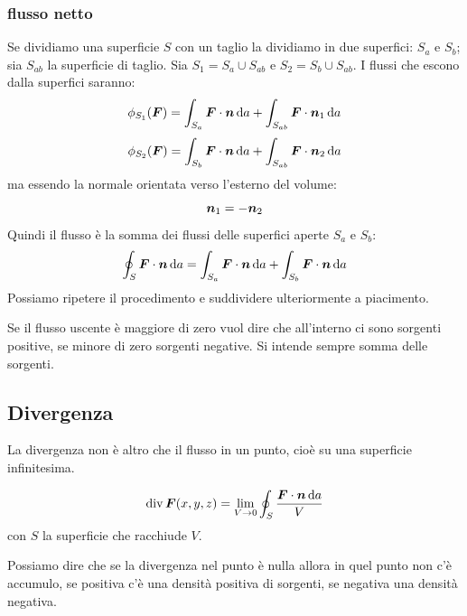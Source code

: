 \subsubsection{flusso netto}
Se dividiamo una superficie $S$ con un taglio la dividiamo in due superfici: $S_a$ e $S_b$; sia $S_{ab}$ la superficie di taglio. Sia $S_1=S_a\cup S_{ab}$ e $S_2=S_b\cup S_{ab}$. I flussi che escono dalla superfici saranno:
\begin{equation*}\phi_{S_1}(\boldsymbol{F})=\int_{S_a}\boldsymbol{F}\cdot\boldsymbol{n}\,\mathrm{d} a+\int_{S_{ab}}\boldsymbol{F}\cdot\boldsymbol{n}_1\,\mathrm{d} a\end{equation*}
\begin{equation*}\phi_{S_2}(\boldsymbol{F})=\int_{S_b}\boldsymbol{F}\cdot\boldsymbol{n}\,\mathrm{d} a+\int_{S_{ab}}\boldsymbol{F}\cdot\boldsymbol{n}_2\,\mathrm{d} a\end{equation*}
ma essendo la normale orientata verso l'esterno del volume:
\begin{equation*}\boldsymbol{n}_1=-\boldsymbol{n}_2\end{equation*}
Quindi il flusso è la somma dei flussi delle superfici aperte $S_a$ e $S_b$:
\begin{equation*}\oint_S\boldsymbol{F}\cdot\boldsymbol{n}\,\mathrm{d} a=\int_{S_a}\boldsymbol{F}\cdot\boldsymbol{n}\,\mathrm{d} a+\int_{S_b}\boldsymbol{F}\cdot \boldsymbol{n}\,\mathrm{d} a\end{equation*}
Possiamo ripetere il procedimento e suddividere ulteriormente a piacimento.

Se il flusso uscente è maggiore di zero vuol dire che all'interno ci sono sorgenti positive, se minore di zero sorgenti negative. Si intende sempre somma delle sorgenti.
\subsection{Divergenza}
La divergenza non è altro che il flusso in un punto, cioè su una superficie infinitesima.
\begin{Def}
\begin{equation*}\operatorname{div} \boldsymbol{F}(x,y,z)=\lim_{V\to 0}\oint_S \frac{\boldsymbol{F}\cdot \boldsymbol{n}\,\mathrm{d} a}{V}\end{equation*}
con $S$ la superficie che racchiude $V$.
\end{Def}

Possiamo dire che se la divergenza nel punto è nulla allora in quel punto non c'è accumulo, se positiva c'è una densità positiva di sorgenti, se negativa una densità negativa.

